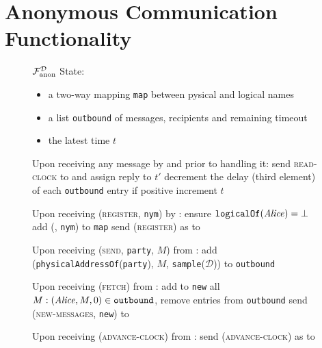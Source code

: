 \section{Anonymous Communication Functionality}
  \label{sec:fanon}
  \begin{figure}[H]
    \begin{systembox}{$\mathcal{F}_{\mathrm{anon}}^{\mathcal{D}}$} 
      State:
      \begin{itemize}
        \item a two-way mapping \texttt{map} between pysical and logical names
        \item a list \texttt{outbound} of messages, recipients and remaining
        timeout
        \item the latest time $t$
      \end{itemize}
      \begin{algorithmic}[1]
        \State Upon receiving any message by \alice{} and prior to handling it:
        \Indent
          \State send \textsc{read-clock} to \gFclock and assign reply to $t'$
            \State decrement the delay (third element) of each \texttt{outbound}
            entry if positive
            \State increment $t$
          \EndIf
        \EndIndent
        \Statex

        \State Upon receiving (\textsc{register}, \texttt{nym}) by \alice:
        \Indent
          \State ensure $\mathtt{logicalOf}(\mathit{Alice}) = \bot$
          \State add (\alice, \texttt{nym}) to \texttt{map}
          \State send (\textsc{register}) as \alice{} to \gFclock
        \EndIndent
        \Statex

        \State Upon receiving (\textsc{send}, \texttt{party}, $M$) from \alice:
        \Indent
          \State add (\texttt{physicalAddressOf}(\texttt{party}), $M$,
          \texttt{sample}($\mathcal{D}$)) to \texttt{outbound} 
        \EndIndent
        \Statex

        \State Upon receiving (\textsc{fetch}) from \alice:
        \Indent
          \State add to \texttt{new} all $M: (\mathit{Alice}, M, 0) \in
          \mathtt{outbound}$, remove entries from \texttt{outbound}
          \State send (\textsc{new-messages}, \texttt{new}) to \alice
        \EndIndent
        \Statex

        \State Upon receiving (\textsc{advance-clock}) from \alice:
        \Indent
          \State send (\textsc{advance-clock}) as \alice{} to \gFclock
        \EndIndent
      \end{algorithmic}
    \end{systembox}
    \caption{}
    \label{alg:fanon}
  \end{figure}
